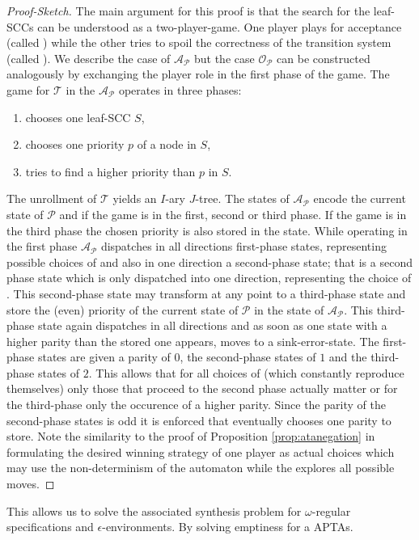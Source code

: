 \begin{proof}[Proof-Sketch]
  The main argument for this proof is that the search for the leaf-\acp{SCC}
  can be understood as a two-player-game. One player plays for acceptance
  (called \acceptor{}) while the other tries to spoil the correctness of the
  transition system (called \spoiler{}). We describe the case of
  $\mathcal{A}_{\mathcal{P}}$ but the case $\mathcal{O}_{\mathcal{P}}$ can be
  constructed analogously by exchanging the player role in the first phase of
  the game. The game for $\mathcal{T}$ in the $\mathcal{A}_{\mathcal{P}}$
  operates in three phases:
  \begin{enumerate}
    \item \spoiler{} chooses one leaf-\ac{SCC} $S$,
    \item \acceptor{} chooses one priority $p$ of a node in $S$,
    \item \spoiler{} tries to find a higher priority than $p$ in $S$.
  \end{enumerate}
  The unrollment of $\mathcal{T}$ yields an $I$-ary $J$-tree. The states of
  $\mathcal{A}_{\mathcal{P}}$ encode the current state of $\mathcal{P}$ and if
  the game is in the first, second or third phase. If the game is in the third
  phase the chosen priority is also stored in the state. While operating in the
  first phase $\mathcal{A}_{\mathcal{P}}$ dispatches in all directions
  first-phase states, representing possible choices of \spoiler{} and also in
  one direction a second-phase state; that is a second phase state which is
  only dispatched into one direction, representing the choice of
  \acceptor{}. This second-phase state may transform at any point to a
  third-phase state and store the (even) priority of the current
  state of $\mathcal{P}$ in the state of $\mathcal{A}_{\mathcal{P}}$. This
  third-phase state again dispatches in all directions and as soon as one state
  with a higher parity than the stored one appears, moves to a
  sink-error-state. The first-phase states are given a parity of $0$, the
  second-phase states of $1$ and the third-phase states of $2$. This allows
  that for all choices of \spoiler{} (which constantly reproduce themselves)
  only those that proceed to the second phase actually matter or for the
  third-phase only the occurence of a higher parity. Since the parity of the
  second-phase states is odd it is enforced that \acceptor{} eventually chooses
  one parity to store. Note the similarity to the proof of Proposition
  \ref{prop:atanegation} in formulating the desired winning strategy of one
  player as actual choices which may use the non-determinism of the automaton
  while the \spoiler{} explores all possible moves.
\end{proof}
This allows us to solve the associated synthesis problem for $\omega$-regular
specifications and $\epsilon$-environments. By solving emptiness for a 
\acp{APTA}.

